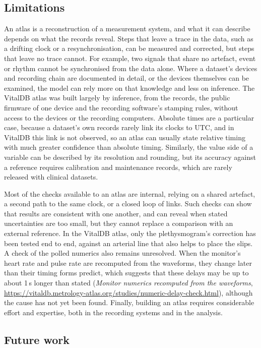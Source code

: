 \documentclass[11pt,a4paper]{article}
\newcommand{\atlaspage}[2]{\emph{#2}, \url{https://vitaldb.metrology-atlas.org/#1.html}}
\begin{document}
\subsection{Limitations}

An atlas is a reconstruction of a measurement system, and what it can describe depends on what the records reveal.
Steps that leave a trace in the data, such as a drifting clock or a resynchronisation, can be measured and corrected,
but steps that leave no trace cannot. For example, two signals that share no artefact, event or rhythm cannot be
synchronised from the data alone. Where a dataset's devices and recording chain are documented in detail, or the
devices themselves can be examined, the model can rely more on that knowledge and less on inference. The VitalDB atlas
was built largely by inference, from the records, the public firmware of one device and the recording software's
stamping rules, without access to the devices or the recording computers. Absolute times are a particular case,
because a dataset's own records rarely link its clocks to UTC, and in VitalDB this link is not observed, so an atlas
can usually state relative timing with much greater confidence than absolute timing. Similarly, the value side of a
variable can be described by its resolution and rounding, but its accuracy against a reference requires calibration
and maintenance records, which are rarely released with clinical datasets.

Most of the checks available to an atlas are internal, relying on a shared artefact, a second path to the same clock,
or a closed loop of links. Such checks can show that results are consistent with one another, and can reveal when
stated uncertainties are too small, but they cannot replace a comparison with an external reference. In the VitalDB
atlas, only the plethysmogram's correction has been tested end to end, against an arterial line that also helps to
place the slips. A check of the polled numerics also remains unresolved. When the monitor's heart rate and pulse rate
are recomputed from the waveforms, they change later than their
timing forms predict, which suggests that these delays may be up to about 1\,s longer than stated
(\atlaspage{studies/numeric-delay-check}{Monitor numerics recomputed from the waveforms}), although the cause has not
yet been found. Finally, building an atlas requires considerable effort and expertise, both in the recording systems
and in the analysis.

\subsection{Future work}
\end{document}
